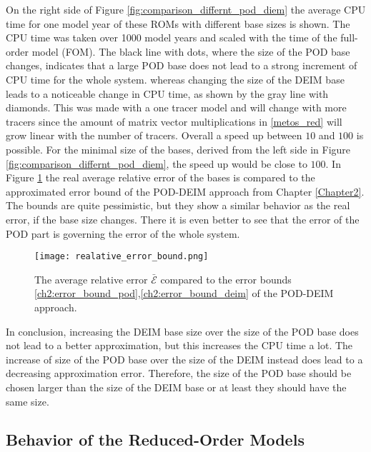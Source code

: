 On the right side of Figure \ref{fig:comparison_differnt_pod_diem} the average CPU time for one model year of these ROMs with different base sizes is shown. The CPU time was taken over 1000 model years and scaled with the time of the 
full-order model (FOM). The black line with dots, where the size of the POD base changes, indicates that a large POD base does not lead to 
a strong increment of CPU time for the whole system. whereas changing the size of the DEIM base leads to a noticeable change in CPU time, as shown by the gray line with diamonds. This was made with
a one tracer model and will change with more tracers since the amount of matrix vector multiplications in \eqref{metos_red} will grow linear with the number of tracers. 
Overall a speed up between $10$ and $100$ is possible. For the minimal size of the bases, derived from the left side in Figure \ref{fig:comparison_differnt_pod_diem},
the speed up would be close to $100$. 
In Figure \ref{fig:error_bound} the real average relative error of the bases is compared to the approximated error bound of the POD-DEIM approach from Chapter \ref{Chapter2}.
The bounds are quite pessimistic, but they show a similar behavior as the real error, if the base size changes. There it is even better to see that the error of the POD part is
governing the error of the whole system. 
\begin{figure}[H]
\centering
  \texttt{[image: realative\_error\_bound.png]}
  \caption{The average relative error $\bar{\mathcal{E}}$ compared to the error bounds \eqref{ch2:error_bound_pod},\eqref{ch2:error_bound_deim} of the POD-DEIM approach.}
  \label{fig:error_bound}
\end{figure}
In conclusion, increasing the DEIM base size over the size of the POD base does not lead to a better approximation, but this increases the CPU time a lot. The increase of size of the POD base over the size of the DEIM instead does lead to a
decreasing approximation error. Therefore, the size of the POD base should be chosen larger than the size of the DEIM base or 
at least they should have the same size.

\subsection{Behavior of the Reduced-Order Models}\label{behaviorofroms}

